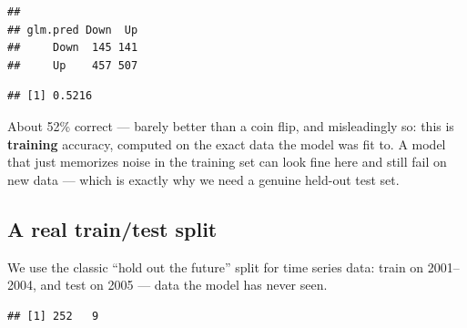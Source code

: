 \documentclass[
  11pt,
]{article}
\newenvironment{Shaded}{\begin{snugshade}}{\end{snugshade}}
\newcommand{\DecValTok}[1]{\textcolor[rgb]{0.00,0.00,0.81}{#1}}
\newcommand{\FloatTok}[1]{\textcolor[rgb]{0.00,0.00,0.81}{#1}}
\newcommand{\FunctionTok}[1]{\textcolor[rgb]{0.13,0.29,0.53}{\textbf{#1}}}
\newcommand{\NormalTok}[1]{#1}
\newcommand{\OtherTok}[1]{\textcolor[rgb]{0.56,0.35,0.01}{#1}}
\newcommand{\SpecialCharTok}[1]{\textcolor[rgb]{0.81,0.36,0.00}{\textbf{#1}}}
\begin{document}
\begin{verbatim}
##         
## glm.pred Down  Up
##     Down  145 141
##     Up    457 507
\end{verbatim}

\begin{Shaded}
\end{Shaded}

\begin{verbatim}
## [1] 0.5216
\end{verbatim}

About 52\% correct --- barely better than a coin flip, and misleadingly
so: this is \textbf{training} accuracy, computed on the exact data the
model was fit to. A model that just memorizes noise in the training set
can look fine here and still fail on new data --- which is exactly why
we need a genuine held-out test set.

\subsection{A real train/test split}\label{a-real-traintest-split}

We use the classic ``hold out the future'' split for time series data:
train on 2001--2004, and test on 2005 --- data the model has never seen.

\begin{Shaded}
\end{Shaded}

\begin{verbatim}
## [1] 252   9
\end{verbatim}
\end{document}
